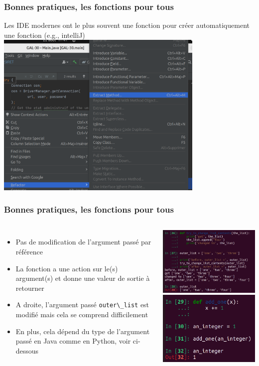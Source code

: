 \documentclass{beamer}
\begin{document}
    \begin{frame}
        \transdissolve
        \frametitle{Bonnes pratiques, les fonctions pour tous}
        Les IDE modernes ont le plus souvent une fonction pour créer automatiquement une fonction (e.g., intelliJ)
        \centering
        \includegraphics[width=10cm]{image/ide-gen-function.png}
    \end{frame}

    \begin{frame}
        \transdissolve
        \frametitle{Bonnes pratiques, les fonctions pour tous}
        \begin{columns}
            \begin{itemize}

                \item Pas de modification de l'argument passé par référence
                \item La fonction a une action sur le(s) argument(s) et donne une valeur de sortie à retourner
                \item A droite, l'argument passé \lstinline{outer\_list} est modifié mais cela se comprend difficilement
                \item En plus, cela dépend du type de l'argument passé en Java comme en Python, voir ci-dessous

            \end{itemize}
            \centering
            \includegraphics[width=5cm]{image/arg-modified-by-reference.png}
            \includegraphics[width=5cm]{image/arg-not-modified.png}
        \end{columns}
    \end{frame}
\end{document}
